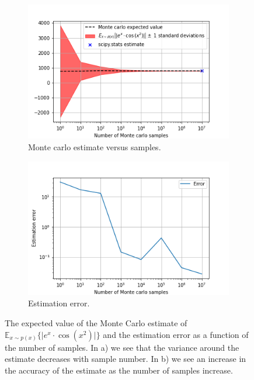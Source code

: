 \documentclass{article}
\begin{document}
\begin{figure}[!htb]
     \centering
     \begin{subfigure}[b]{0.45\textwidth}
         \centering
         \includegraphics[width=\textwidth]{Q1a_fig11.png}
         \caption{Monte carlo estimate versus samples.}
     \end{subfigure}
     \hfill
     \begin{subfigure}[b]{0.45\textwidth}
         \centering
         \includegraphics[width=\textwidth]{Q1a_fig12.png}
         \caption{Estimation error.}
     \end{subfigure}
        \caption{The expected value of the Monte Carlo estimate of $\mathbb{E}_{x\sim p(x)}\{\vert e^x \cdot \cos \left( x^2 \right) \vert \}$ and the estimation error as a function of the number of samples. In a) we see that the variance around the estimate decreases with sample number. In b) we see an increase in the accuracy of the estimate as the number of samples increase.}
        \label{fig:Q1a_7}
\end{figure}
\end{document}
